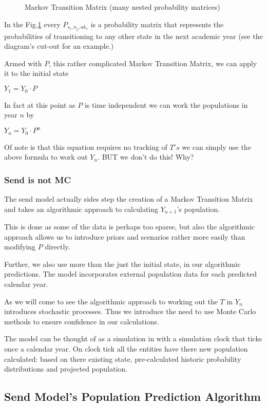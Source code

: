 \documentclass[margin=5mm]{article}
\begin{document}
\begin{figure}[h!]
  \caption{Markov Transition Matrix (many nested probability
    matrices)\label{transition matrix}
  }
\end{figure}

In the Fig.\ref{transition matrix} every $P_{s_i,n_j,ak_1}$ is a
probability matrix that represents the probabilities of transitioning
to any other state in the next academic year (see the diagram's
cut-out for an example.)

Armed with $P$, this rather complicated Markov Transition Matrix, we can
apply it to the initial state

$Y_1 = Y_0 \cdot P$

In fact at this point as $P$ is time independent we can work the
populations in year $n$ by

$Y_n = Y_0 \cdot P^n$

Of note is that this equation requires no tracking of $T's$ we can simply
use the above formula to work out $Y_n$. BUT we don't do this!  Why?

\subsubsection{Send is not MC}

The send model actually sides step the creation of a Markov Transition
Matrix and takes an algorithmic approach to calculating $Y_{n+1}$'s
population.

This is done as some of the data is perhaps too sparse, but also the
algorithmic approach allows us to introduce priors and scenarios
rather more easily than modifying $P$ directly.

Further, we also use more than the just the initial state, in our
algorithmic predictions.  The model incorporates external population
data for each predicted calendar year.

As we will come to see the algorithmic approach to working out the $T$
in $Y_n$ introduces stochastic processes. Thus we introduce the need
to use Monte Carlo methods to ensure confidence in our calculations.

The model can be thought of as a simulation in with a simulation clock
that ticks once a calendar year. On clock tick all the entities have
there new population calculated: based on there existing state,
pre-calculated historic probability distributions and projected
population.

\subsection{Send Model's Population Prediction Algorithm}
\end{document}
